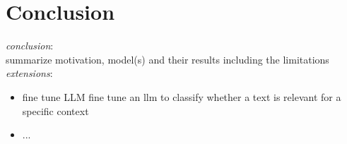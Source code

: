 \chapter{Conclusion}\label{sec7}
\thispagestyle{empty}

\textit{conclusion}: \\
summarize motivation, model(s) and their results including the limitations \\

\noindent
\textit{extensions}:
\begin{itemize}
	\item fine tune LLM fine tune an llm to classify whether a text is relevant for a specific context
	\item ...
\end{itemize}




\cleardoublepage
